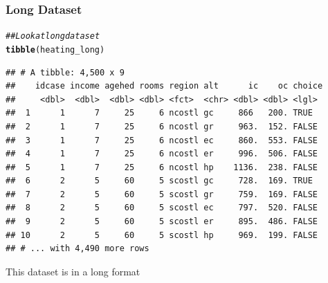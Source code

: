 \documentclass{beamer}\usepackage[]{graphicx}\usepackage[]{xcolor}
\makeatletter
\newcommand{\hlstr}[1]{\textcolor[rgb]{0.192,0.494,0.8}{#1}}%
\newcommand{\hlcom}[1]{\textcolor[rgb]{0.678,0.584,0.686}{\textit{#1}}}%
\newcommand{\hlopt}[1]{\textcolor[rgb]{0,0,0}{#1}}%
\newcommand{\hlstd}[1]{\textcolor[rgb]{0.345,0.345,0.345}{#1}}%
\newcommand{\hlkwb}[1]{\textcolor[rgb]{0.69,0.353,0.396}{#1}}%
\newcommand{\hlkwc}[1]{\textcolor[rgb]{0.333,0.667,0.333}{#1}}%
\newcommand{\hlkwd}[1]{\textcolor[rgb]{0.737,0.353,0.396}{\textbf{#1}}}%
\newenvironment{kframe}{%
 \def\at@end@of@kframe{}%
 \ifinner\ifhmode%
  \def\at@end@of@kframe{\end{minipage}}%
  \begin{minipage}{\columnwidth}%
 \fi\fi%
 \def\FrameCommand##1{\hskip\@totalleftmargin \hskip-\fboxsep
 \colorbox{shadecolor}{##1}\hskip-\fboxsep
     \hskip-\linewidth \hskip-\@totalleftmargin \hskip\columnwidth}%
 \MakeFramed {\advance\hsize-\width
   \@totalleftmargin\z@ \linewidth\hsize
   \@setminipage}}%
 {\par\unskip\endMakeFramed%
 \at@end@of@kframe}
\newenvironment{knitrout}{}{} %
\makeatother
\begin{document}

\begin{frame}[fragile]\frametitle{Long Dataset}
\begin{knitrout}\footnotesize
{}\color{fgcolor}\begin{kframe}
\begin{alltt}
\hlcom{## Look at long dataset}
\hlkwd{tibble}\hlstd{(heating_long)}
\end{alltt}
\begin{verbatim}
## # A tibble: 4,500 x 9
##    idcase income agehed rooms region alt      ic    oc choice
##     <dbl>  <dbl>  <dbl> <dbl> <fct>  <chr> <dbl> <dbl> <lgl> 
##  1      1      7     25     6 ncostl gc     866   200. TRUE  
##  2      1      7     25     6 ncostl gr     963.  152. FALSE 
##  3      1      7     25     6 ncostl ec     860.  553. FALSE 
##  4      1      7     25     6 ncostl er     996.  506. FALSE 
##  5      1      7     25     6 ncostl hp    1136.  238. FALSE 
##  6      2      5     60     5 scostl gc     728.  169. TRUE  
##  7      2      5     60     5 scostl gr     759.  169. FALSE 
##  8      2      5     60     5 scostl ec     797.  520. FALSE 
##  9      2      5     60     5 scostl er     895.  486. FALSE 
## 10      2      5     60     5 scostl hp     969.  199. FALSE 
## # ... with 4,490 more rows
\end{verbatim}
\end{kframe}
\end{knitrout}
    \vspace{2ex}
    This dataset is in a long format
\end{frame}
\end{document}
